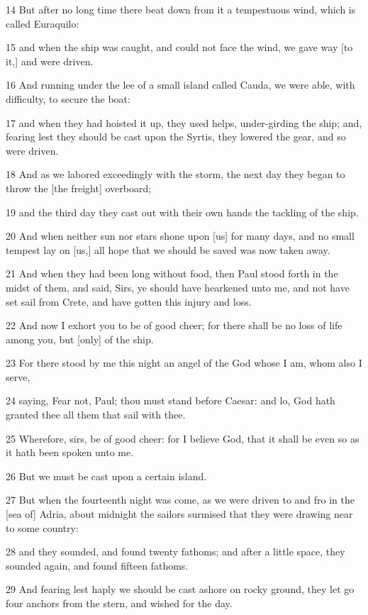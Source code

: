 \par 14 But after no long time there beat down from it a tempestuous wind, which is called Euraquilo:
\par 15 and when the ship was caught, and could not face the wind, we gave way [to it,] and were driven.
\par 16 And running under the lee of a small island called Cauda, we were able, with difficulty, to secure the boat:
\par 17 and when they had hoisted it up, they used helps, under-girding the ship; and, fearing lest they should be cast upon the Syrtis, they lowered the gear, and so were driven.
\par 18 And as we labored exceedingly with the storm, the next day they began to throw the [the freight] overboard;
\par 19 and the third day they cast out with their own hands the tackling of the ship.
\par 20 And when neither sun nor stars shone upon [us] for many days, and no small tempest lay on [us,] all hope that we should be saved was now taken away.
\par 21 And when they had been long without food, then Paul stood forth in the midst of them, and said, Sirs, ye should have hearkened unto me, and not have set sail from Crete, and have gotten this injury and loss.
\par 22 And now I exhort you to be of good cheer; for there shall be no loss of life among you, but [only] of the ship.
\par 23 For there stood by me this night an angel of the God whose I am, whom also I serve,
\par 24 saying, Fear not, Paul; thou must stand before Caesar: and lo, God hath granted thee all them that sail with thee.
\par 25 Wherefore, sirs, be of good cheer: for I believe God, that it shall be even so as it hath been spoken unto me.
\par 26 But we must be cast upon a certain island.
\par 27 But when the fourteenth night was come, as we were driven to and fro in the [sea of] Adria, about midnight the sailors surmised that they were drawing near to some country:
\par 28 and they sounded, and found twenty fathoms; and after a little space, they sounded again, and found fifteen fathoms.
\par 29 And fearing lest haply we should be cast ashore on rocky ground, they let go four anchors from the stern, and wished for the day.
